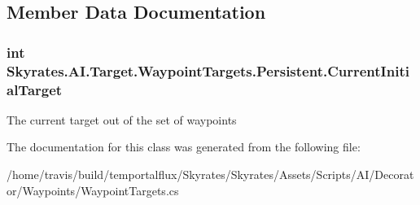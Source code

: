 \subsection{Member Data Documentation}
\hypertarget{class_skyrates_1_1_a_i_1_1_target_1_1_waypoint_targets_1_1_persistent_ac5d258057158129627cf1196a04b7eb1}{
\subsubsection[{Current\-Initial\-Target}]{\setlength{\rightskip}{0pt plus 5cm}int Skyrates.\-A\-I.\-Target.\-Waypoint\-Targets.\-Persistent.\-Current\-Initial\-Target}}\label{class_skyrates_1_1_a_i_1_1_target_1_1_waypoint_targets_1_1_persistent_ac5d258057158129627cf1196a04b7eb1}


The current target out of the set of waypoints 



The documentation for this class was generated from the following file\-:\begin{DoxyCompactItemize}
\item 
/home/travis/build/temportalflux/\-Skyrates/\-Skyrates/\-Assets/\-Scripts/\-A\-I/\-Decorator/\-Waypoints/Waypoint\-Targets.\-cs\end{DoxyCompactItemize}
